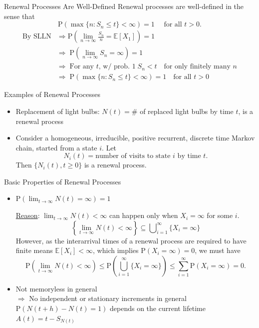 \documentclass[letterpaper,handout, mathserif]{beamer}
\def\p{\mathrm P}
\def\E{\mathbb E}
\begin{document}
\begin{frame}{Renewal Processes Are Well-Defined}
Renewal processes are well-defined in the sense that
 $$\p(\max\{n: S_n\le t\}<\infty)=1\quad\text{ for all }t>0.$$\pause
\begin{align*}
\text{By SLLN}&\Rightarrow\p\left(\lim_{n\to\infty}\frac{S_n}{n}=\E[X_1]\right)=1\\
&\Rightarrow\;\p\left(\lim_{n\to\infty}S_n =\infty\right)=1\\
&\Rightarrow\;\text{For any $t$, w/ prob. 1}\;S_n<t \quad\text{for only finitely many }n\\
&\Rightarrow\;\p(\max\{n: S_n\le t\}<\infty)=1\quad\text{for all }t>0
\end{align*}
\end{frame}
\begin{frame}{Examples of Renewal Processes}
\begin{itemize}
\item Replacement of light bulbs: $N(t)=\#$ of replaced light bulbs by time $t$, is a renewal process
\item Consider a homogeneous, irreducible, positive recurrent, discrete time Markov chain, started from a state $i$.
Let
$$N_i(t)=\text{number of visits to state $i$ by time }t.$$
Then $\{N_i(t), t\ge 0\}$ is a renewal process.
\end{itemize}
\end{frame}
\begin{frame}{Basic Properties of Renewal Processes}
\begin{itemize}[<+->]
\item $\p(\lim_{t\to\infty}N(t)=\infty)=1$\medskip

\underline{Reason}: $\lim_{t\to\infty}N(t)<\infty$ can happen only when $X_i=\infty$ for some $i$.
$$\left\{\lim_{t\to\infty}N(t)<\infty\right\}\subseteq \bigcup\nolimits_{i=1}^{\infty}\{X_i=\infty\}$$
However, as the interarrival times of a renewal process are required to have finite means
$\E[X_i]<\infty$, which implies $\p(X_i=\infty)=0$, we must have
$$\p\left(\lim_{t\to\infty}N(t)<\infty\right)
\le\p\left(\bigcup_{i=1}^{\infty}\{X_i=\infty\}\right)
\le\sum_{i=1}^{\infty}\p(X_i=\infty)=0.$$
\item Not memoryless in general\\[3pt]
$\Rightarrow$ No independent or stationary increments in general\\
$\p(N(t+h)-N(t)=1)$ depends on the current lifetime $A(t)=t-S_{N(t)}$
\end{itemize}
\end{frame}
\end{document}
